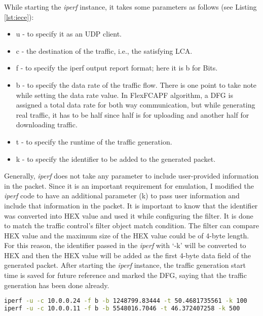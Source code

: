 While starting the \textit{iperf} instance, it takes some parameters as follows (see Listing \ref{lst:iece}):
\begin{itemize}
	\item u - to specify it as an UDP client.
\item c - the destination of the traffic, i.e., the satisfying LCA.
\item f - to specify the iperf output report format; here it is b for Bits.
\item b - to specify the data rate of the traffic flow. There is one point to take note while setting the data rate value. In FlexFCAPF algorithm, a DFG is assigned a total data rate for both way communication, but while generating real traffic, it has to be half since half is for uploading and another half for downloading traffic.
\item t - to specify the runtime of the traffic generation.
\item k - to specify the identifier to be added to the generated packet.
\end{itemize}

Generally, \textit{iperf} does not take any parameter to include user-provided information in the packet. Since it is an important requirement for emulation, I modified the \textit{iperf} code to have an additional parameter (k) to pass user information and include that information in the packet. It is important to know that the identifier was converted into HEX value and used it while configuring the filter. It is done to match the traffic control's filter object match condition. The filter can compare HEX value and the maximum size of the HEX value could be of 4-byte length. For this reason, the identifier passed in the \textit{iperf} with `-k' will be converted to HEX and then the HEX value will be added as the first 4-byte data field of the generated packet. After starting the \textit{iperf} instance, the traffic generation start time is saved for future reference and marked the DFG, saying that the traffic generation has been done already.

\begin{lstlisting}[caption={Iperf instance command example},label={lst:iece},language=bash,tabsize=2,basicstyle=\footnotesize,breaklines=true,showspaces=false,showstringspaces=false,showtabs=false,frame=single]
iperf -u -c 10.0.0.24 -f b -b 1248799.83444 -t 50.4681735561 -k 100
iperf -u -c 10.0.0.11 -f b -b 5548016.7046 -t 46.372407258 -k 500
\end{lstlisting}

